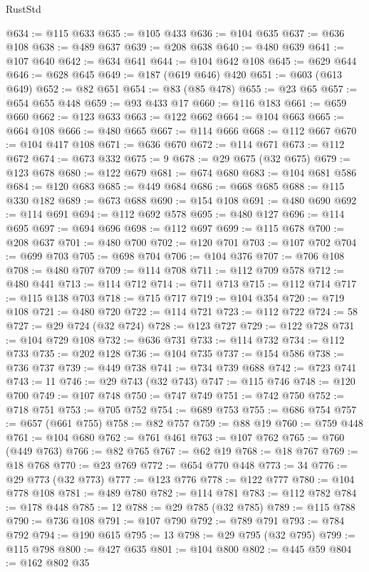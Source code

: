 \begin{lexlean}{RustStd}
\begin{coremodule}
{\begin{coremodule}
{{{{{{{{{{{{{{{{{{{{{{{{{{{{{{{{{{{{{{{{{{{{{{{{{{{{{{{@634 := @115 @633
@635 := @105 @433
@636 := @104 @635
@637 := @636 @108
@638 := @489 @637
@639 := @208 @638
@640 := @480 @639
@641 := @107 @640
@642 := @634 @641
@644 := @104 @642 @108
@645 := @629 @644
@646 := @628 @645
@649 := @187 (@619 @646) @420
@651 := @603 (@613 @649)
@652 := @82 @651
@654 := @83 (@85 @478)
@655 := @23 @65
@657 := @654 @655 @448
@659 := @93 @433 @17
@660 := @116 @183
@661 := @659 @660
@662 := @123 @633
@663 := @122 @662
@664 := @104 @663
@665 := @664 @108
@666 := @480 @665
@667 := @114 @666
@668 := @112 @667
@670 := @104 @417 @108
@671 := @636 @670
@672 := @114 @671
@673 := @112 @672
@674 := @673 @332
@675 := 9
@678 := @29 @675 (@32 @675)
@679 := @123 @678
@680 := @122 @679
@681 := @674 @680
@683 := @104 @681 @586
@684 := @120 @683
@685 := @449 @684
@686 := @668 @685
@688 := @115 @330 @182
@689 := @673 @688
@690 := @154 @108
@691 := @480 @690
@692 := @114 @691
@694 := @112 @692 @578
@695 := @480 @127
@696 := @114 @695
@697 := @694 @696
@698 := @112 @697
@699 := @115 @678
@700 := @208 @637
@701 := @480 @700
@702 := @120 @701
@703 := @107 @702
@704 := @699 @703
@705 := @698 @704
@706 := @104 @376
@707 := @706 @108
@708 := @480 @707
@709 := @114 @708
@711 := @112 @709 @578
@712 := @480 @441
@713 := @114 @712
@714 := @711 @713
@715 := @112 @714
@717 := @115 @138 @703
@718 := @715 @717
@719 := @104 @354
@720 := @719 @108
@721 := @480 @720
@722 := @114 @721
@723 := @112 @722
@724 := 58
@727 := @29 @724 (@32 @724)
@728 := @123 @727
@729 := @122 @728
@731 := @104 @729 @108
@732 := @636 @731
@733 := @114 @732
@734 := @112 @733
@735 := @202 @128
@736 := @104 @735
@737 := @154 @586
@738 := @736 @737
@739 := @449 @738
@741 := @734 @739 @688
@742 := @723 @741
@743 := 11
@746 := @29 @743 (@32 @743)
@747 := @115 @746
@748 := @120 @700
@749 := @107 @748
@750 := @747 @749
@751 := @742 @750
@752 := @718 @751
@753 := @705 @752
@754 := @689 @753
@755 := @686 @754
@757 := @657 (@661 @755)
@758 := @82 @757
@759 := @88 @19
@760 := @759 @448
@761 := @104 @680
@762 := @761 @461
@763 := @107 @762
@765 := @760 (@449 @763)
@766 := @82 @765
@767 := @62 @19
@768 := @18 @767
@769 := @18 @768
@770 := @23 @769
@772 := @654 @770 @448
@773 := 34
@776 := @29 @773 (@32 @773)
@777 := @123 @776
@778 := @122 @777
@780 := @104 @778 @108
@781 := @489 @780
@782 := @114 @781
@783 := @112 @782
@784 := @178 @448
@785 := 12
@788 := @29 @785 (@32 @785)
@789 := @115 @788
@790 := @736 @108
@791 := @107 @790
@792 := @789 @791
@793 := @784 @792
@794 := @190 @615
@795 := 13
@798 := @29 @795 (@32 @795)
@799 := @115 @798
@800 := @427 @635
@801 := @104 @800
@802 := @445 @59
@804 := @162 @802 @35
}}}}}}}}}}}}}}}}}}}}}}}}}}}}}}}}}}}}}}}}}}}}}}}}}}}}}}}
\end{coremodule}}
\end{coremodule}
\end{lexlean}
